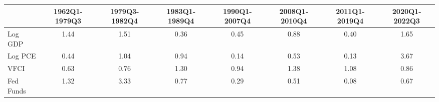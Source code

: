 \begin{table}[ht]
\centering
\begin{tabular}{lccccccc}
  \hline
 & 1962Q1-1979Q3 & 1979Q3-1982Q4 & 1983Q1-1989Q4 & 1990Q1-2007Q4 & 2008Q1-2010Q4 & 2011Q1-2019Q4 & 2020Q1-2022Q3 \\ 
  \hline
Log GDP & 1.44 & 1.51 & 0.36 & 0.45 & 0.88 & 0.40 & 1.65 \\ 
  Log PCE & 0.44 & 1.04 & 0.94 & 0.14 & 0.53 & 0.13 & 3.67 \\ 
  VFCI & 0.63 & 0.76 & 1.30 & 0.94 & 1.38 & 1.08 & 0.86 \\ 
  Fed Funds & 1.32 & 3.33 & 0.77 & 0.29 & 0.51 & 0.08 & 0.67 \\ 
   \hline
\end{tabular}
\end{table}
